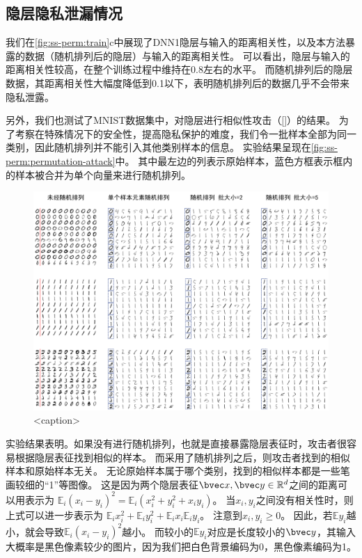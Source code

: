 \subsection{隐层隐私泄漏情况}
我们在\autoref{fig:ss-perm:train}c中展现了DNN1隐层与输入的距离相关性，以及本方法暴露的数据（随机排列后的隐层）与输入的距离相关性。
%
可以看出，隐层与输入的距离相关性较高，在整个训练过程中维持在0.8左右的水平。
而随机排列后的隐层数据，其距离相关性大幅度降低到0.1以下，表明随机排列后的数据几乎不会带来隐私泄露。
%


另外，我们也测试了MNIST数据集中，对隐层进行相似性攻击（\autoref{}）的结果。
%
为了考察在特殊情况下的安全性，提高隐私保护的难度，我们令一批样本全部为同一类别，因此随机排列并不能引入其他类别样本的信息。
%
实验结果呈现在\autoref{fig:ss-perm:permutation-attack}中。
%
其中最左边的列表示原始样本，蓝色方框表示框内的样本被合并为单个向量来进行随机排列。


\begin{figure}[h!]
    \centering
    \includegraphics[width=\linewidth]{Z_Resources/ss-perm_permutation-attack.png}
    \caption{<caption>}
    \label{fig:ss-perm:permutation-attack}
\end{figure}

实验结果表明。如果没有进行随机排列，也就是直接暴露隐层表征时，攻击者很容易根据隐层表征找到相似的样本。
%
而采用了随机排列之后，则攻击者找到的相似样本和原始样本无关。
%
无论原始样本属于哪个类别，找到的相似样本都是一些笔画较细的“1”等图像。
%
这是因为两个隐层表征$\bvec x, \bvec y \in \mathbb R^d$之间的距离可以用表示为
$\mathbb E_i (x_i - y_i)^2 = \mathbb E_i (x_i^2 + y_i^2 + x_i y_i)$。
%
当$x_i, y_i$之间没有相关性时，则上式可以进一步表示为
$\mathbb E_i x_i^2 + \mathbb E_i y_i^2 + \mathbb E_i x_i \mathbb E_i y_i$。
%
注意到$x_i, y_i \ge 0$。
%
因此，若$\mathbb E y_i$越小，就会导致$\mathbb E_i (x_i - y_i)^2$越小。
%
而较小的$\mathbb Ey_i$对应是长度较小的$\bvec y$，其输入大概率是黑色像素较少的图片，因为我们把白色背景编码为0，黑色像素编码为1。
%
